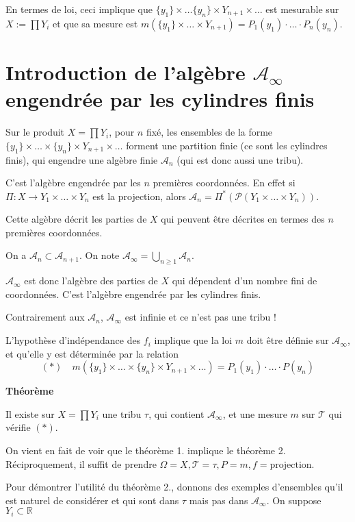 \documentclass[10pt,a4paper,notitlepage ]{report}
\newcounter{th}
\newenvironment{theorem}[1][]{
\refstepcounter{th}
\begin{tcolorbox}
	\textbf{Théorème \theth \ #1}
	
	
}{\end{tcolorbox}}
\begin{document}
En termes de loi, ceci implique que $\{y_1\}\times \dots \{y_n\} \times Y_{n+1} \times \dots$ est mesurable sur $X:=\prod Y_i$ et que sa mesure est $m(\{y_1\}\times \dots \times Y_{n+1}) = P_1(y_1) \cdot \dots \cdot P_n(y_n)$.

\section{Introduction de l'algèbre $\mathcal A_\infty$ engendrée par les cylindres finis}

Sur le produit $X = \prod Y_i$, pour $n$ fixé, les ensembles de la forme $\{y_1\}\times \dots \times \{y_n\}\times Y_{n+1} \times \dots$ forment une partition finie (ce sont les cylindres finis), qui engendre une algèbre finie $\mathcal A_n$ (qui est donc aussi une tribu).

C'est l'algèbre engendrée par les $n$ premières coordonnées. En effet si $\Pi : X \rightarrow Y_1 \times \dots \times Y_n$ est la projection, alors $\mathcal A_n = \Pi^* (\mathcal P(Y_1 \times \dots \times Y_n))$.

Cette algèbre décrit les parties de $X$ qui peuvent être décrites en termes des $n$ premières coordonnées.

On a $\mathcal A_n \subset \mathcal A_{n+1}$. On note $\mathcal A_\infty = \underset{n\ge 1}{\bigcup} \mathcal A_n$.

$\mathcal A_\infty$ est donc l'algèbre des parties de $X$ qui dépendent d'un nombre fini de coordonnées. C'est l'algèbre engendrée par les cylindres finis.

Contrairement aux $\mathcal A_n$, $\mathcal A_\infty$ est infinie et ce n'est pas une tribu !

L'hypothèse d'indépendance des $f_i$ implique que la loi $m$ doit être définie sur $\mathcal A_\infty$, et qu'elle y est déterminée par la relation \[ (*) \quad m(\{y_1\}\times \dots \times \{y_n\} \times Y_{n+1} \times \dots ) = P_1(y_1) \cdot\dots\cdot P(y_n)\]

\begin{theorem}
	Il existe sur $X = \prod Y_i$ une tribu $\tau$, qui contient $\mathcal A_\infty$, et une mesure $m$ sur $\mathcal T$ qui vérifie $(*)$.
\end{theorem}

On vient en fait de voir que le théorème 1. implique le théorème 2.
Réciproquement, il suffit de prendre $\Omega = X, \mathcal T = \tau, P=m, f=\text{projection}$.

Pour démontrer l'utilité du théorème 2., donnons des exemples d'ensembles qu'il est naturel de considérer et qui sont dans $\tau$ mais pas dans $\mathcal A_\infty$. On suppose $Y_i \subset \mathbb R$
\end{document}
